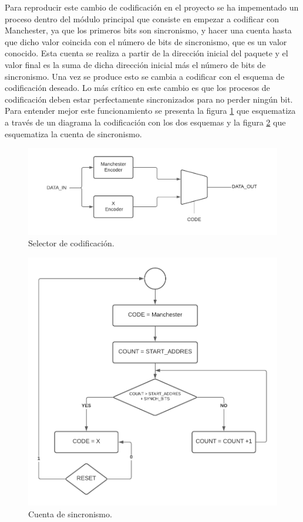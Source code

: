 Para reproducir este cambio de codificación en el proyecto se ha impementado un proceso 
dentro del módulo principal que consiste en empezar a codificar con Manchester, ya
que los primeros bits son sincronismo, y hacer una cuenta hasta que dicho valor 
coincida con el número de bits de sincronismo, que es un valor conocido. Esta cuenta
se realiza a partir de la dirección inicial del paquete y el valor final es la suma de 
dicha dirección inicial más el número de bits de sincronismo. Una vez se 
produce esto se cambia a codificar con el esquema de codificación deseado. Lo más 
crítico en este cambio es que los procesos de codificación deben estar perfectamente 
sincronizados para no perder ningún bit. Para entender mejor este funcionamiento se 
presenta la figura \ref{selec_code} 
que esquematiza a través de un diagrama la codificación con los dos esquemas y la
figura \ref{cuenta} que esquematiza la cuenta de sincronismo.

\begin{figure}[ht]
    \centering
    \includegraphics[scale=0.8]{./figuras/selec_code.pdf}
    \caption{\small{Selector de codificación.}}
    \label{selec_code}%
\end{figure}

\begin{figure}[ht]
    \centering
    \includegraphics[scale=0.65]{./figuras/cuenta.pdf}
    \caption{\small{Cuenta de sincronismo.}}
    \label{cuenta}%
\end{figure}

